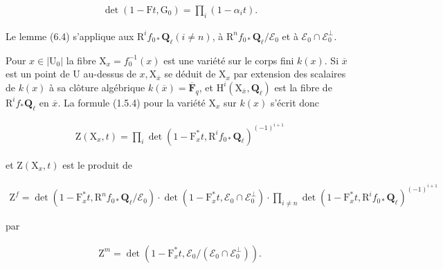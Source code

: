\documentclass[10pt,leqno]{article}
\begin{document}
\begin{equation*}\begin{gathered}\operatorname{det}(1- \mathrm{F}t,\mathrm{G}_{0})=\prod _{i}(1- \alpha _{i} t).\end{gathered}\end{equation*}

\noindent Le lemme (6.4) s’applique aux \(\mathrm{R}^{i} f_{0*}\mathbf{Q}_{\ell } (i\ne n)\), à \(\mathrm{R}^{n} f_{0*}\mathbf{Q}_{\ell }/\mathcal{E} _{0}\) et à \(\mathcal{E} _{0}\cap \mathcal{E} _{0}^{\perp }\).\par

\noindent Pour \(x\in |\mathrm{U}_{0}|\) la fibre \(\mathrm{X}_{x}=f_{0}^{- 1}(x)\) est une variété sur le corps fini \(k(x)\). Si \(\overline{x}\) est un point de \(\mathrm{U}\) au-dessus de \(x, \mathrm{X}_{\overline{x}}\) se déduit de \(\mathrm{X}_{x}\) par extension des scalaires de \(k(x)\) à sa clôture algébrique \(k(\overline{x})=\overline{\mathbf{F}}_{q}\), et \(\mathrm{H}^{i}(\mathrm{X}_{\overline{x}},\mathbf{Q}_{\ell })\) est la fibre de \(\mathrm{R}^{i} f_{*}\mathbf{Q}_{\ell }\) en \(\overline{x}\). La formule (1.5.4) pour la variété \(\mathrm{X}_{x}\) sur \(k(x)\) s’écrit donc\par

\begin{equation*}\begin{gathered}\mathrm{Z}(\mathrm{X}_{x},t)=\prod _{i} \operatorname{det}(1- \mathrm{F}_{x}^{*}t,\mathrm{R}^{i} f_{0*}\mathbf{Q}_{\ell })^{(- 1)^{i+1}}\end{gathered}\end{equation*}

\noindent et \(\mathrm{Z}(\mathrm{X}_{x},t)\) est le produit de\par

\begin{equation*}\begin{gathered}\mathrm{Z}^{f}=\operatorname{det}(1- \mathrm{F}_{x}^{*}t,\mathrm{R}^{n} f_{0*}\mathbf{Q}_{\ell }/\mathcal{E} _{0})\cdot \operatorname{det}(1- \mathrm{F}_{x}^{*}t,\mathcal{E} _{0}\cap \mathcal{E} _{0}^{\perp })\cdot \prod _{i\ne n}\operatorname{det}(1- \mathrm{F}_{x}^{*}t,\mathrm{R}^{i} f_{0*}\mathbf{Q}_{\ell })^{(- 1)^{i+1}}\end{gathered}\end{equation*}

\noindent par\par

\begin{equation*}\begin{gathered}\mathrm{Z}^{m}=\operatorname{det}(1- \mathrm{F}_{x}^{*}t,\mathcal{E} _{0}/(\mathcal{E} _{0}\cap \mathcal{E} _{0}^{\perp })).\end{gathered}\end{equation*}
\end{document}

